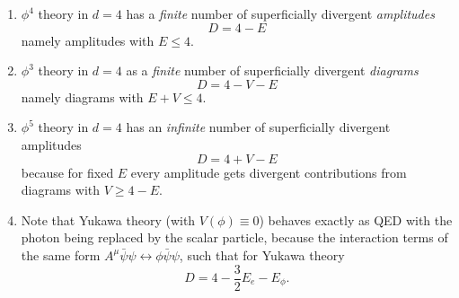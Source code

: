 \begin{enumerate}
	\item $\phi^4$ theory in $d=4$ has a \emph{finite} number of superficially divergent \emph{amplitudes}
	\begin{equation}
	D=4-E
	\end{equation}
	namely amplitudes with $E\leq 4$.
	\item $\phi^3$ theory in $d=4$ as a \emph{finite} number of superficially divergent \emph{diagrams}
	\begin{equation}
		D=4-V-E
	\end{equation}
	namely diagrams with $E+V\leq 4$.
	\item $\phi^5$ theory in $d=4$ has an \emph{infinite} number of superficially divergent amplitudes
	\begin{equation}
		D=4+V-E
	\end{equation}
because for fixed $E$ every amplitude gets divergent contributions from diagrams with $V \geq 4-E$.
\item Note that Yukawa theory (with $V(\phi)\equiv 0$) behaves exactly as QED with the photon being replaced by the scalar particle, because the interaction terms of the same form $A^\mu \bar{\psi} \psi \leftrightarrow\phi \bar{\psi} \psi$, such that for Yukawa theory
\begin{equation}
	D=4-\frac{3}{2}E_e-E_\phi.
\end{equation}
\end{enumerate}


